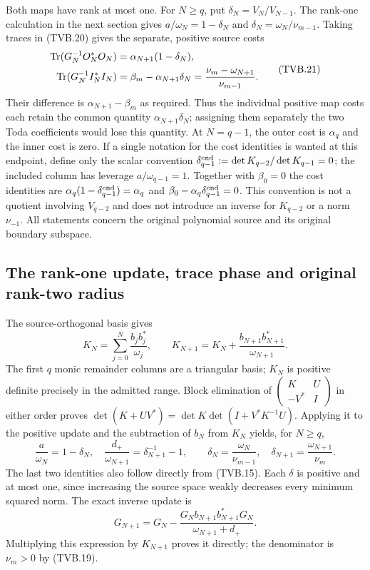 Both maps have rank at most one. For $N\ge q$, put
$\delta_N=V_N/V_{N-1}$. The rank-one calculation in the next
section gives $a/\omega_N=1-\delta_N$ and
$\delta_N=\omega_N/\nu_{m-1}$. Taking traces in (TVB.20) gives
the separate, positive source costs
\[
 \begin{split}
 \operatorname{Tr}(G_N^{-1}O_N^*O_N)&=\alpha_{N+1}(1-\delta_N),\\
 \operatorname{Tr}(G_N^{-1}I_N^*I_N)&=\beta_m-\alpha_{N+1}\delta_N
                   =\frac{\nu_m-\omega_{N+1}}{\nu_{m-1}}.
 \end{split}
 \tag{TVB.21}
\]
Their difference is $\alpha_{N+1}-\beta_m$ as required.
Thus the individual positive map costs each retain the common
quantity $\alpha_{N+1}\delta_N$; assigning them separately
the two Toda coefficients would lose this quantity.
At $N=q-1$, the outer cost is $\alpha_q$ and the inner cost is
zero. If a single notation for the cost identities is wanted at
this endpoint, define only the scalar convention
$\delta_{q-1}^{\rm end}:=\det K_{q-2}/\det K_{q-1}=0$;
the included column has leverage $a/\omega_{q-1}=1$.
Together with $\beta_0=0$ the cost identities are
$\alpha_q(1-\delta_{q-1}^{\rm end})=\alpha_q$ and
$\beta_0-\alpha_q\delta_{q-1}^{\rm end}=0$.
This convention is not a quotient involving $V_{q-2}$ and does
not introduce an inverse for $K_{q-2}$ or a norm $\nu_{-1}$.
All statements concern the original polynomial source and its
original boundary subspace.

\subsection[\hspace{0.4em}The rank-one update, trace phase and original rank-two radius]{The rank-one update, trace phase and original rank-two radius}

The source-orthogonal basis gives
\[
 K_N=\sum_{j=0}^N\frac{b_jb_j^*}{\omega_j},\qquad
 K_{N+1}=K_N+\frac{b_{N+1}b_{N+1}^*}{\omega_{N+1}}.
 \tag{TVB.22}
\]
The first $q$ monic remainder columns are a triangular basis;
$K_N$ is positive definite precisely in the admitted range.
Block elimination of
$\left(\begin{smallmatrix}K&U\\-V^*&I\end{smallmatrix}\right)$
in either order proves
$\det(K+UV^*)=\det K\det(I+V^*K^{-1}U)$.
Applying it to the positive update and the subtraction of $b_N$
from $K_N$ yields, for $N\ge q$,
\[
 \frac a{\omega_N}=1-\delta_N,\quad
 \frac{d_+}{\omega_{N+1}}=\delta_{N+1}^{-1}-1,\qquad
 \delta_N=\frac{\omega_N}{\nu_{m-1}},\quad
 \delta_{N+1}=\frac{\omega_{N+1}}{\nu_m}.
 \tag{TVB.23}
\]
The last two identities also follow directly from (TVB.15).
Each $\delta$ is positive and at most one, since increasing the
source space weakly decreases every minimum squared norm.
The exact inverse update is
\[
 G_{N+1}=G_N-
 \frac{G_Nb_{N+1}b_{N+1}^*G_N}{\omega_{N+1}+d_+}.
 \tag{TVB.24}
\]
Multiplying this expression by $K_{N+1}$ proves it directly;
the denominator is $\nu_m>0$ by (TVB.19).


